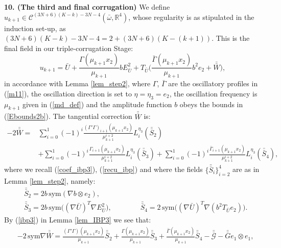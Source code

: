 \documentclass[reqno,twoside,11pt]{amsart}
\newcommand{\sym}{\mathrm{sym}}
\newcommand{\R}{\mathbb{R}}
\newcommand*{\dbar}[1]{\bar{\bar{#1}}}
\numberwithin{equation}{section}
\theoremstyle{plain}
\theoremstyle{definition}
\begin{document}
{\bf 10. (The third and final corrugation)}
We define $u_{k+1}\in\mathcal{C}^{(3N+6)(K-k)-3N-4}(\bar\omega,
\R^4)$, whose regularity is as stipulated in the induction set-up, as
$(3N+6)(K-k)-3N-4 = 2+ (3N+6)(K-(k+1))$. This is the final field in
our triple-corrugation Stage:
\begin{equation}\label{corru3}
u_{k+1}=\bar U+\frac{\Gamma(\mu_{k+1} x_2)}{\mu_{k+1}} bE^2_{\bar U} +
T_{\bar U}\Big(\frac{\bar\Gamma(\mu_{k+1} x_2)}{\mu_{k+1}}b^2 e_2+ \dbar W\Big),
\end{equation}
in accordance with Lemma \ref{lem_step2}, where $\Gamma$, $\bar\Gamma$ are the oscillatory
profiles in (\ref{m11}), the oscillation direction is set to
$\eta=\eta_3=e_2$, the oscillation frequency is $\mu_{k+1}$ given in
(\ref{md_def}) and the amplitude function  $b$ obeys the bounds in
(\ref{Ebounds2b}).
The tangential correction $\dbar W$ is:
\begin{equation*}
\begin{split}
-2\dbar W =   & \sum_{i=0}^1 (-1)^i \frac{(\Gamma'\Gamma)_{i+1}(\mu_{k+1} x_2
 )}{\mu_{k+1} ^{i+2}}L_i^{\eta_3}(\dbar S_2)  
\\ & + \sum_{i=0}^1 (-1)^i \frac{\Gamma_{i+1}(\mu_{k+1} x_2)}{\mu_{k+1}^{i+2}}L_i^{\eta_3}(\dbar S_3) 
+ \sum_{i=0}^1 (-1)^i \frac{\bar\Gamma_{i+1}(\mu_{k+1} x_2)}{\mu_{k+1}^{i+2}}L_i^{\eta_3}(\dbar S_4),
\end{split}
\end{equation*}
where we recall (\ref{coef_ibp3}), (\ref{recu_ibp})
and  where the fields $\{\dbar S_i\}_{i=2}^4$ are as in Lemma \ref{lem_step2}, namely:
\begin{equation}\label{S_third}
\begin{split}
& \dbar S_2 = 2b\,\sym(\nabla b \otimes e_2),\\
& \dbar S_3 = 2b\,\sym\big((\nabla \bar U)^T\nabla E^2_{\bar U}\big), \qquad\qquad
\dbar S_4 =2\,\sym\big((\nabla \bar U)^T\nabla (b^2 T_{\bar U}e_2)\big).
\end{split}
\end{equation}
By (\ref{ibp3}) in Lemma \ref{lem_IBP3} we see that:
\begin{equation}\label{symWdbar}
\begin{split}
& -2\,\sym\nabla \dbar W = \frac{(\Gamma'\Gamma)(\mu_{k+1}x_2)}{\mu_{k+1}} \dbar S_2 
+ \frac{\Gamma(\mu_{k+1} x_2)}{\mu_{k+1}} \dbar S_3+ \frac{\bar\Gamma(\mu_{k+1}
  x_2)}{\mu_{k+1}} \dbar S_4  - \dbar{\mathcal{G}} - \dbar G e_1\otimes e_1, 
\end{split}
\end{equation}
\end{document}
